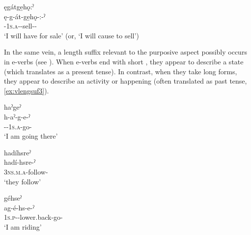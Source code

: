 \ex ęgátge̱hǫ:ˀ\\
\gll ę-g-át-ge̱hǫ-:-ˀ\\
\fut-\textsc{1s.a}-{\semireflexive}-sell-{\causative}-{\punctual}\\
\glt ‘I will have for sale’ (or, ‘I will cause to sell’)

\z
\z


In the same vein, a length \stem{-:} suffix relevant to the purposive aspect possibly occurs in e-verbs (see ). When e-verbs end with short , they appear to describe a state (which translates as a present tense). In contrast, when they take long  forms, they appear to describe an activity or happening (often translated as past tense, \ref{ex:vlengsuf3}).

\ea\label{ex:vlengsuf3} 
\ea haˀgeˀ\\
\gll h-aˀ-g-e-ˀ\\
 {\translocative}-{\factual}-\textsc{1s.a}-go-{\punctual}\\
\glt `I am going there'


\ex hadíhsreˀ\\
\gll hadí-hsre-ˀ\\
 \textsc{3ns.m.a}-follow-{\stative}\\
\glt `they follow'


\ex géhseˀ\\
    \gll ag-é-hs-e-ˀ\\
    \textsc{1s.p}-{\joinerE}-lower.back-go-{\stative}\\
        \glt ‘I am riding'



